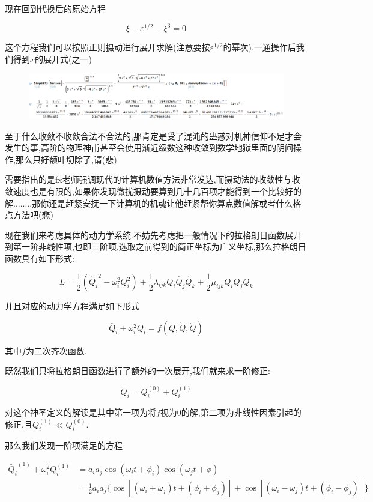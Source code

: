 \documentclass[UTF8]{article}
\begin{document}
	现在回到代换后的原始方程
	
	\[\xi-\varepsilon^{1/2}-\xi^3=0\]
	
	这个方程我们可以按照正则摄动进行展开求解(注意要按$\varepsilon^{1/2}$的幂次).一通操作后我们得到$x$的展开式(之一)
	
	\begin{figure}[H]
		\centering
		\includegraphics[width=1\linewidth]{pics/QQ截图20210720223418}
		\label{fig:qq20210720223418}
	\end{figure}
	
	至于什么收敛不收敛合法不合法的,那肯定是受了混沌的蛊惑对机神信仰不足才会发生的事,高阶的物理神甫甚至会使用渐近级数这种收敛到数学地狱里面的阴间操作,那么只好额叶切除了,请(悲)
	
	需要指出的是fx老师强调现代的计算机数值方法非常发达,而摄动法的收敛性与收敛速度也是有限的,如果你发现微扰摄动要算到几十几百项才能得到一个比较好的解........那你还是赶紧安抚一下计算机的机魂让他赶紧帮你算点数值解或者什么格点方法吧(悲)
	
	现在我们来考虑具体的动力学系统.不妨先考虑把一般情况下的拉格朗日函数展开到第一阶非线性项,也即三阶项.选取之前得到的简正坐标为广义坐标,那么拉格朗日函数具有如下形式:
	
	\[L=\frac12 (\dot{Q_i}^2-\omega_i^2Q_i^2)+\frac12 \lambda_{ijk}Q_i\dot{Q_j}\dot{Q_k}+\frac12 \mu_{ijk}Q_iQ_jQ_k\]
	
	并且对应的动力学方程满足如下形式
	
	\[\ddot{Q_i}+\omega_i^2Q_i=f(Q,\dot{Q},\ddot{Q})\]
	
	其中$f$为二次齐次函数.
	
	既然我们只将拉格朗日函数进行了额外的一次展开,我们就来求一阶修正:
	
	\[Q_i=Q_i^{(0)}+Q_i^{(1)}\]
	
	对这个神圣定义的解读是其中第一项为将$f$视为0的解,第二项为非线性因素引起的修正,且$Q_i^{(1)}\ll Q_i^{(0)}$.
	
	那么我们发现一阶项满足的方程
	
	\begin{align*}
		\ddot{Q_i}^{(1)}+\omega_i^2Q_i^{(1)}&=a_ia_j\cos(\omega_i t+\phi_i)\cos(\omega_j t+\phi)\\
		&=\frac12a_ia_j\{\cos[(\omega_i+\omega_j)t+(\phi_i+\phi_j)]+\cos[(\omega_i-\omega_j)t+(\phi_i-\phi_j)]\}
	\end{align*}
	
\end{document}
